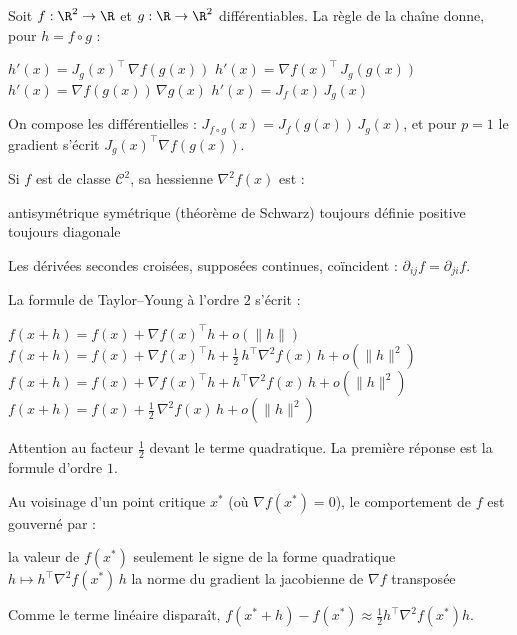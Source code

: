 \begin{question}
Soit $f:\R^2\to\R$ et $g:\R\to\R^2$ différentiables. La règle de la chaîne donne, pour $h=f\circ g$ :
\begin{reponses}
  \bonne $h'(x)=J_g(x)^{\top}\,\nabla f(g(x))$
  \mauvaise $h'(x)=\nabla f(x)^{\top}\,J_g(g(x))$
  \mauvaise $h'(x)=\nabla f(g(x))\,\nabla g(x)$
  \mauvaise $h'(x)=J_f(x)\,J_g(x)$
\end{reponses}
\begin{explication}
On compose les différentielles : $J_{f\circ g}(x)=J_f(g(x))\,J_g(x)$, et pour $p=1$ le gradient s'écrit $J_g(x)^{\top}\nabla f(g(x))$.
\end{explication}
\end{question}

\begin{question}
Si $f$ est de classe $\mathcal C^2$, sa hessienne $\nabla^2f(x)$ est :
\begin{reponses}
  \mauvaise antisymétrique
  \bonne symétrique (théorème de Schwarz)
  \mauvaise toujours définie positive
  \mauvaise toujours diagonale
\end{reponses}
\begin{explication}
Les dérivées secondes croisées, supposées continues, coïncident : $\partial_{ij}f=\partial_{ji}f$.
\end{explication}
\end{question}

\begin{question}
La formule de Taylor--Young à l'ordre $2$ s'écrit :
\begin{reponses}
  \mauvaise $f(x+h)=f(x)+\nabla f(x)^{\top}h+o(\|h\|)$
  \bonne $f(x+h)=f(x)+\nabla f(x)^{\top}h+\tfrac12\,h^{\top}\nabla^2f(x)\,h+o(\|h\|^2)$
  \mauvaise $f(x+h)=f(x)+\nabla f(x)^{\top}h+h^{\top}\nabla^2f(x)\,h+o(\|h\|^2)$
  \mauvaise $f(x+h)=f(x)+\tfrac12\,\nabla^2f(x)\,h+o(\|h\|^2)$
\end{reponses}
\begin{explication}
Attention au facteur $\frac12$ devant le terme quadratique. La première réponse est la formule d'ordre $1$.
\end{explication}
\end{question}

\begin{question}
Au voisinage d'un point critique $x^*$ (où $\nabla f(x^*)=0$), le comportement de $f$ est gouverné par :
\begin{reponses}
  \mauvaise la valeur de $f(x^*)$ seulement
  \bonne le signe de la forme quadratique $h\mapsto h^{\top}\nabla^2f(x^*)\,h$
  \mauvaise la norme du gradient
  \mauvaise la jacobienne de $\nabla f$ transposée
\end{reponses}
\begin{explication}
Comme le terme linéaire disparaît, $f(x^*+h)-f(x^*)\approx\frac12h^{\top}\nabla^2f(x^*)h$.
\end{explication}
\end{question}
